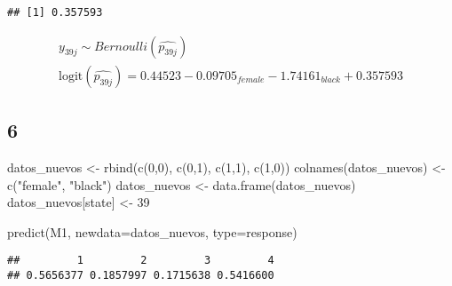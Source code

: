 \documentclass[
]{article}
\newenvironment{Shaded}{\begin{snugshade}}{\end{snugshade}}
\newcommand{\AttributeTok}[1]{\textcolor[rgb]{0.77,0.63,0.00}{#1}}
\newcommand{\DecValTok}[1]{\textcolor[rgb]{0.00,0.00,0.81}{#1}}
\newcommand{\FunctionTok}[1]{\textcolor[rgb]{0.00,0.00,0.00}{#1}}
\newcommand{\NormalTok}[1]{#1}
\newcommand{\OtherTok}[1]{\textcolor[rgb]{0.56,0.35,0.01}{#1}}
\newcommand{\StringTok}[1]{\textcolor[rgb]{0.31,0.60,0.02}{#1}}
\begin{document}
\begin{verbatim}
## [1] 0.357593
\end{verbatim}

\begin{align} 
y_{39j}  \sim  Bernoulli(\hat{p_{39j}}) \\ 
\text{logit}(\hat{p_{39j}}) = 0.44523 -0.09705_{female} -1.74161_{black}  + 0.357593
\end{align}

\hypertarget{section-4}{%
\subsection{6}\label{section-4}}

\begin{Shaded}
\begin{Highlighting}[]
\NormalTok{datos\_nuevos }\OtherTok{\textless{}{-}} \FunctionTok{rbind}\NormalTok{(}\FunctionTok{c}\NormalTok{(}\DecValTok{0}\NormalTok{,}\DecValTok{0}\NormalTok{),}
                      \FunctionTok{c}\NormalTok{(}\DecValTok{0}\NormalTok{,}\DecValTok{1}\NormalTok{),}
                      \FunctionTok{c}\NormalTok{(}\DecValTok{1}\NormalTok{,}\DecValTok{1}\NormalTok{),}
                      \FunctionTok{c}\NormalTok{(}\DecValTok{1}\NormalTok{,}\DecValTok{0}\NormalTok{))}
\FunctionTok{colnames}\NormalTok{(datos\_nuevos) }\OtherTok{\textless{}{-}} \FunctionTok{c}\NormalTok{(}\StringTok{"female"}\NormalTok{, }\StringTok{"black"}\NormalTok{)}
\NormalTok{datos\_nuevos }\OtherTok{\textless{}{-}} \FunctionTok{data.frame}\NormalTok{(datos\_nuevos)}
\NormalTok{datos\_nuevos[}\StringTok{\textquotesingle{}state\textquotesingle{}}\NormalTok{] }\OtherTok{\textless{}{-}} \DecValTok{39}

\FunctionTok{predict}\NormalTok{(M1, }\AttributeTok{newdata=}\NormalTok{datos\_nuevos, }\AttributeTok{type=}\StringTok{\textquotesingle{}response\textquotesingle{}}\NormalTok{)}
\end{Highlighting}
\end{Shaded}

\begin{verbatim}
##         1         2         3         4 
## 0.5656377 0.1857997 0.1715638 0.5416600
\end{verbatim}
\end{document}
